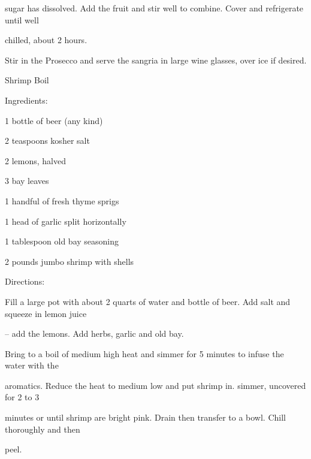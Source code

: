 \documentclass[a4paper,portrait,12pt]{book}
\begin{document}
sugar has dissolved. Add the fruit and stir well to combine. Cover and refrigerate until well




chilled, about 2 hours.




Stir in the Prosecco and serve the sangria in large wine glasses, over ice if desired.







\newpage
Shrimp Boil




Ingredients:




1 bottle of beer (any kind)




2 teaspoons kosher salt




2 lemons, halved




3 bay leaves




1 handful of fresh thyme sprigs




1 head of garlic split horizontally




1 tablespoon old bay seasoning




2 pounds jumbo shrimp with shells




Directions:




Fill a large pot with about 2 quarts of water and bottle of beer. Add salt and squeeze in lemon juice




-- add the lemons. Add herbs, garlic and old bay.




Bring to a boil of medium high heat and simmer for 5 minutes to infuse the water with the




aromatics. Reduce the heat to medium low and put shrimp in. simmer, uncovered for 2 to 3




minutes or until shrimp are bright pink. Drain then transfer to a bowl. Chill thoroughly and then




peel.
\end{document}
